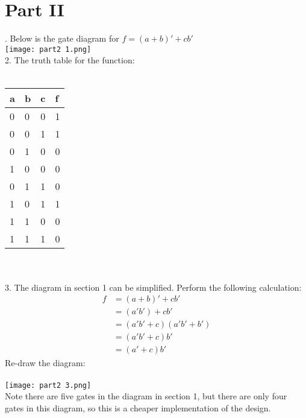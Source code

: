 \documentclass[12pt]{article}
\begin{document}
	\section*{Part II}. Below is the gate diagram for $f=(a+b)'+cb'$\\\texttt{[image: part2 1.png]}\\
	2. The truth table for the function: \\\\\hspace*{100pt}
	\begin{tabular}{|p{4em}|p{4em}|p{4em}|p{4em}|}\hline
		a & b & c & f \\\hline
		0 & 0 & 0 & 1 \\\hline
		0 & 0 & 1 & 1 \\\hline
		0 & 1 & 0 & 0 \\\hline
		1 & 0 & 0 & 0 \\\hline
		0 & 1 & 1 & 0 \\\hline
		1 & 0 & 1 & 1 \\\hline
		1 & 1 & 0 & 0 \\\hline
		1 & 1 & 1 & 0 \\\hline
	\end{tabular}\\\\
	3. The diagram in section 1 can be simplified. Perform the following calculation:\\
	\begin{align*}
		f&=(a+b)'+cb'\\
		&=(a'b')+cb'\\
		&=(a'b'+c)(a'b'+b')\tag{by distributive law}\\
		&=(a'b'+c)b'\tag{since b' being true is equvalent to a'b'+b' being true}\\
		&=(a'+c)b'\tag{since b' is satisfied by the second part, it can be removed}
	\end{align*}
	Re-draw the diagram:\\
	\\\texttt{[image: part2 3.png]}\\
	Note there are five gates in the diagram in section 1, but there are only four gates in this diagram, so this is a cheaper implementation of the design.
	
	
\end{document}
